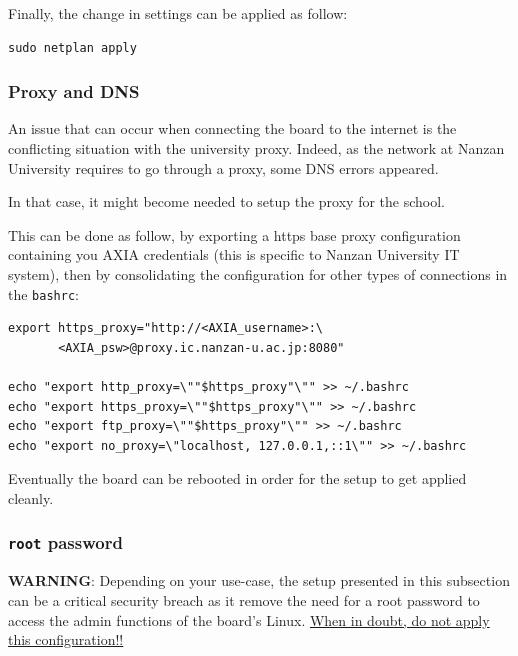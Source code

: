 \documentclass[10pt]{article}
\begin{document}
Finally, the change in settings can be applied
as follow:

\begin{verbatim}
sudo netplan apply
\end{verbatim}

\subsubsection{Proxy and DNS}
\label{sec:orgb2613a9}
An issue that can occur when connecting the board to the internet is the
conflicting situation with the university proxy.
Indeed, as the network at Nanzan University requires to go through a proxy,
some DNS errors appeared.

In that case, it might become needed to setup the proxy for the school.

This can be done as follow, by exporting a https base proxy configuration
containing you AXIA credentials (this is specific to Nanzan University IT system),
then by consolidating the configuration for other types of connections in the \texttt{bashrc}:

\begin{verbatim}
export https_proxy="http://<AXIA_username>:\
       <AXIA_psw>@proxy.ic.nanzan-u.ac.jp:8080"

echo "export http_proxy=\""$https_proxy"\"" >> ~/.bashrc
echo "export https_proxy=\""$https_proxy"\"" >> ~/.bashrc
echo "export ftp_proxy=\""$https_proxy"\"" >> ~/.bashrc
echo "export no_proxy=\"localhost, 127.0.0.1,::1\"" >> ~/.bashrc
\end{verbatim}

Eventually the board can be rebooted in order for the setup to get applied cleanly.

\subsubsection{\texttt{root} password}
\label{sec:org02f8451}
\begin{tcolorbox}[colback=orange!5!white,colframe=orange!75!black]
\textbf{WARNING}: Depending on your use-case, the setup presented in this
subsection can be a critical security breach as it remove the need for a root
password to access the admin functions of the board's Linux.
\uline{When in doubt, do not apply this configuration!!}
\end{tcolorbox}
\end{document}
